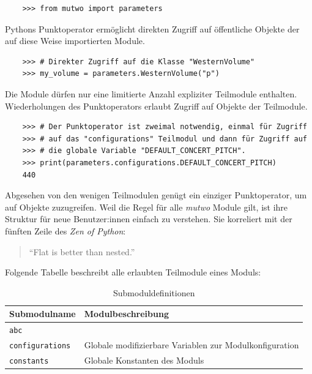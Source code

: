 \documentclass[12pt,a4paper,ngerman]{article}
\begin{document}
\lstset{language=Python}

\begin{lstlisting}
    >>> from mutwo import parameters
\end{lstlisting}

Pythons Punktoperator ermöglicht direkten Zugriff auf öffentliche Objekte der auf diese Weise importierten Module.

\lstset{language=Python}

\begin{lstlisting}
    >>> # Direkter Zugriff auf die Klasse "WesternVolume"
    >>> my_volume = parameters.WesternVolume("p")
\end{lstlisting}

Die Module dürfen nur eine limitierte Anzahl expliziter Teilmodule enthalten.
Wiederholungen des Punktoperators erlaubt Zugriff auf Objekte der Teilmodule.

\lstset{language=Python}

\begin{lstlisting}
    >>> # Der Punktoperator ist zweimal notwendig, einmal für Zugriff
    >>> # auf das "configurations" Teilmodul und dann für Zugriff auf
    >>> # die globale Variable "DEFAULT_CONCERT_PITCH".
    >>> print(parameters.configurations.DEFAULT_CONCERT_PITCH)
    440
\end{lstlisting}

Abgesehen von den wenigen Teilmodulen genügt ein einziger Punktoperator, um auf Objekte zuzugreifen.
Weil die Regel für alle \emph{mutwo} Module gilt, ist ihre Struktur für neue Benutzer:innen einfach zu verstehen.
Sie korreliert mit der fünften Zeile des \emph{Zen of Python}:

\begin{quote}
    ``Flat is better than nested.''~\parencite{theZenOfPython}
\end{quote}

Folgende Tabelle beschreibt alle erlaubten Teilmodule eines Moduls:

\begin{table}[H]
    \begin{center}
        \begin{tabular}{l l} 
            \hline
            Submodulname & Modulbeschreibung \\ [0.5ex] 
            \hline\hline
            \texttt{abc} & \emph{\nameref{abstractBaseClasses}} \\  %
            \texttt{configurations} & Globale modifizierbare Variablen zur Modulkonfiguration \\
            \texttt{constants} & Globale Konstanten des Moduls \\
            \hline
        \end{tabular}
    \end{center}

    \caption{Submoduldefinitionen}
\end{table}
\end{document}
